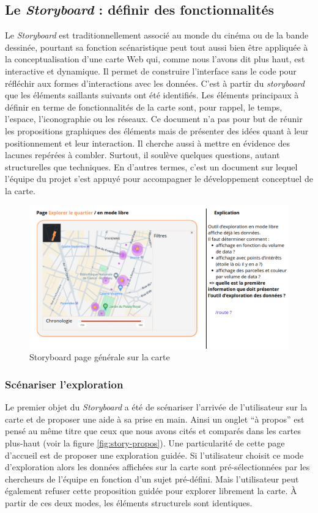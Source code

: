 \subsection{Le \textit{Storyboard} : définir des fonctionnalités}
Le \textit{Storyboard} est traditionnellement associé au monde du cinéma ou de la bande dessinée, pourtant sa fonction scénaristique peut tout aussi bien être appliquée à la conceptualisation d'une carte Web qui, comme nous l'avons dit plus haut, est interactive et dynamique. Il permet de construire l'interface sans le code pour réfléchir aux formes d'interactions avec les données. C'est à partir du \textit{storyboard} que les éléments saillants suivants ont été identifiés. Les éléments principaux à définir en terme de fonctionnalités de la carte sont, pour rappel, le temps, l'espace, l'iconographie ou les réseaux. Ce document n'a pas pour but de réunir les propositions graphiques des éléments mais de présenter des idées quant à leur positionnement et leur interaction. Il cherche aussi à mettre en évidence des lacunes repérées à combler. Surtout, il soulève quelques questions, autant structurelles que techniques. En d'autres termes, c'est un document sur lequel l'équipe du projet s'est appuyé pour accompagner le développement conceptuel de la carte. 

\begin{figure}[h!]
    \centering
    \includegraphics[width=1\linewidth]{images/storyboard-all.png}
    \caption{Storyboard page générale sur la carte}
    \label{fig:story-all}
\end{figure}
\subsubsection{Scénariser l'exploration}
Le premier objet du \textit{Storyboard} a été de scénariser l'arrivée de l'utilisateur sur la carte et de proposer une aide à sa prise en main. Ainsi un onglet \enquote{à propos} est pensé au même titre que ceux que nous avons cités et comparés dans les cartes plus-haut (voir la figure \ref{fig:story-propos}). Une particularité de cette page d'accueil est de proposer une exploration guidée. Si l'utilisateur choisit ce mode d'exploration alors les données affichées sur la carte sont pré-sélectionnées par les chercheurs de l'équipe en fonction d'un sujet pré-défini. Mais l'utilisateur peut également refuser cette proposition guidée pour explorer librement la carte. À partir de ces deux modes, les éléments structurels sont identiques.

